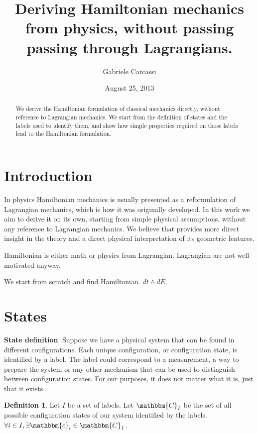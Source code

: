 \documentclass[twocolumn,floatfix,nofootinbib]{revtex4}   %
\theoremstyle{theorem}
\theoremstyle{definition}
\newtheorem{defn}[thm]{Definition}
\begin{document}
\title{Deriving Hamiltonian mechanics from physics, without passing passing through Lagrangians.}
\author{Gabriele Carcassi}
\date{August 25, 2013}

\begin{abstract}
We derive the Hamiltonian formulation of classical mechanics directly, without reference to Lagrangian mechanics.
We start from the definition of states and the labels used to identify them, and show how simple properties required
on those labels lead to the Hamiltonian formulation.\end{abstract}

\maketitle

\section{Introduction}
In physics Hamiltonian mechanics is usually presented as a reformulation of Lagrangian mechanics, which is how it was originally developed. In this work we aim to derive it on its own, starting from simple physical assumptions, without any reference to Lagrangian mechanics. We believe that provides more direct insight in the theory and a direct physical interpretation of its geometric features.



Hamiltonian is either math or physics from Lagrangian. Lagrangian are not well motivated anyway.

We start from scratch and find Hamiltonian. $dt \wedge dE$

\section{States}
\textbf{State definition}. Suppose we have a physical system that can be found in different configurations. Each unique configuration, or configuration state, is identified by a label. The label could correspond to a measurement, a way to prepare the system or any other mechanism that can be used to distinguish between configuration states. For our purposes, it does not matter what it is, just that it exists.

\begin{defn}\label{statedef}
Let $I$ be a set of labels. Let $\mathbbm{C}_{I}$ be the set of all possible configuration states of our system identified by the labels. $\forall i \in I, \exists \mathbbm{c}_{i} \in \mathbbm{C}_{I}$.
\end{defn}
\end{document}
